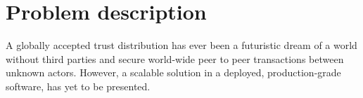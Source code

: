 \chapter{Problem description}


A globally accepted trust distribution has ever been a futuristic dream of a world without third parties and secure world-wide peer to peer transactions between unknown actors. However, a scalable solution in a deployed, production-grade software, has yet to be presented. 



